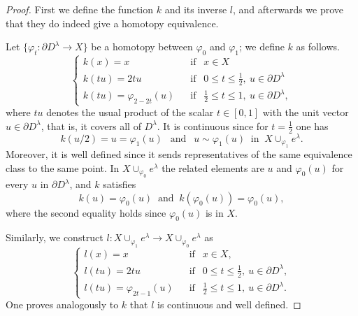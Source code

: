 \begin{proof}

    First we define the function $k$ and its inverse $l$, and afterwards we prove that they do indeed give a homotopy equivalence.

    Let $\{\varphi_t:\partial D^{\lambda} \to X\}$ be a homotopy between $\varphi_0$ and $\varphi_1$; we define $k$ as follows.
    \begin{equation*}
        \begin{cases}
            k(x) = x &~~\text{ if }~~ x\in X\\
            k(tu) = 2tu &~~\text{ if }~~ 0\le t\le \frac{1}{2},~u\in \partial D^{\lambda}\\
            k(tu) = \varphi_{2-2t}(u) &~~\text{ if }~~  \frac{1}{2} \le t\le 1,~u\in \partial D^{\lambda},
        \end{cases}
    \end{equation*}
    where $tu$ denotes the usual product of the scalar $t\in [0,1]$ with the unit vector $u\in \partial D^{\lambda}$, that is, it covers all of $D^{\lambda}$. It is continuous since for $t=\frac{1}{2}$ one has
    \begin{equation*}
        k(u/2) = u = \varphi_{1}(u) ~~\text{ and }~~ u \sim \varphi_{1}(u) ~\text{ in }~ X\cup_{\varphi_1} e^{\lambda}.
    \end{equation*}
    Moreover, it is well defined since it sends representatives of the same equivalence class to the same point. In $X\cup_{\varphi_0} e^{\lambda}$ the related elements are $u$ and $\varphi_0(u)$ for every $u$ in $\partial D^{\lambda}$, and $k$ satisfies
    \begin{equation*}
        k(u) = \varphi_{0}(u) ~\text{ and }~ k(\varphi_{0}(u)) = \varphi_{0}(u),
    \end{equation*}
    where the second equality holds since $\varphi_{0}(u)$ is in $X$.

    Similarly, we construct $l: X\cup_{\varphi_1} e^{\lambda} \to X\cup_{\varphi_0} e^{\lambda}$ as
    \begin{equation*}
        \begin{cases}
            l(x) = x &~~\text{ if }~~ x\in X,\\
            l(tu) = 2tu &~~\text{ if }~~ 0\le t\le \frac{1}{2},~u\in \partial D^{\lambda},\\
            l(tu) = \varphi_{2t-1}(u) &~~\text{ if }~~  \frac{1}{2} \le t\le 1,~u\in \partial D^{\lambda}.
        \end{cases}
    \end{equation*}
    One proves analogously to $k$ that $l$ is continuous and well defined.


\end{proof}

